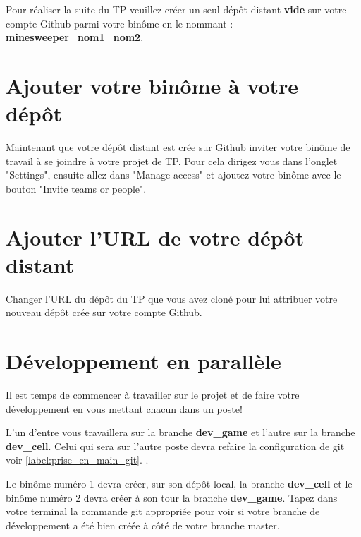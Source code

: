 Pour réaliser la suite du TP veuillez créer un seul dépôt distant \textbf{vide} sur votre compte Github parmi votre binôme en le nommant : \textbf{minesweeper\_nom1\_nom2}.

\section{Ajouter votre binôme à votre dépôt}

Maintenant que votre dépôt distant est crée sur Github inviter votre binôme de travail à se joindre à votre projet de TP. Pour cela dirigez vous dans l'onglet "Settings", ensuite allez dans "Manage access" et ajoutez votre binôme avec le bouton "Invite teams or people".

\section{Ajouter l'URL de votre dépôt distant}

Changer l'URL du dépôt du TP que vous avez cloné pour lui attribuer votre nouveau dépôt crée sur votre compte Github. %

\medskip

%
%

\section{Développement en parallèle}

Il est temps de commencer à travailler sur le projet et de faire votre développement en vous mettant chacun dans un poste! %

\medskip

L'un d'entre vous travaillera sur la branche \textbf{dev\_game} et l'autre sur la branche \textbf{dev\_cell}. Celui qui sera sur l'autre poste devra refaire la configuration de git voir \ref{label:prise_en_main_git}. .

Le binôme numéro 1 devra créer, sur son dépôt local, la branche \textbf{dev\_cell} et le binôme numéro 2 devra créer à son tour la branche \textbf{dev\_game}. Tapez dans votre terminal la commande git appropriée pour voir si votre branche de développement a été bien créée à côté de votre branche master.

